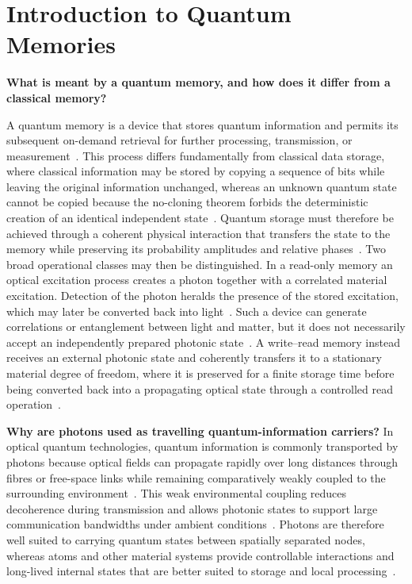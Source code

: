 \section{Introduction to Quantum Memories}
\label{sec:quantum_memories}

\noindent\textbf{What is meant by a quantum memory, and how does it differ from a classical memory?}

A quantum memory is a device that stores quantum information and permits its subsequent on-demand retrieval for further processing, transmission, or measurement~\cite{Qmeaara_HeshamiEtAl_2016,Oqm_LvovskyEtAl_2009}. This process differs fundamentally from classical data storage, where classical information may be stored by copying a sequence of bits while leaving the original information unchanged, whereas an unknown quantum state cannot be copied because the no-cloning theorem forbids the deterministic creation of an identical independent state~\cite{Oqm_LvovskyEtAl_2009}. Quantum storage must therefore be achieved through a coherent physical interaction that transfers the state to the memory while preserving its probability amplitudes and relative phases~\cite{AWAVQMitCoSR_Rodriguez_,Oqm_LvovskyEtAl_2009}. Two broad operational classes may then be distinguished. In a read-only memory an optical excitation process creates a photon together with a correlated material excitation. Detection of the photon heralds the presence of the stored excitation, which may later be converted back into light~\cite{AWAVQMitCoSR_Rodriguez_}. Such a device can generate correlations or entanglement between light and matter, but it does not necessarily accept an independently prepared photonic state~\cite{AWAVQMitCoSR_Rodriguez_}. A write--read memory instead receives an external photonic state and coherently transfers it to a stationary material degree of freedom, where it is preserved for a finite storage time before being converted back into a propagating optical state through a controlled read operation~\cite{Qmeaara_HeshamiEtAl_2016,AWAVQMitCoSR_Rodriguez_}.

\noindent\textbf{Why are photons used as travelling quantum-information carriers?}
In optical quantum technologies, quantum information is commonly transported by photons because optical fields can propagate rapidly over long distances through fibres or free-space links while remaining comparatively weakly coupled to the surrounding environment~\cite{Qmeaara_HeshamiEtAl_2016}. This weak environmental coupling reduces decoherence during transmission and allows photonic states to support large communication bandwidths under ambient conditions~\cite{Oqm_LvovskyEtAl_2009,Qmeaara_HeshamiEtAl_2016}. Photons are therefore well suited to carrying quantum states between spatially separated nodes, whereas atoms and other material systems provide controllable interactions and long-lived internal states that are better suited to storage and local processing~\cite{QmfpDp_FleischhauerEtAl_2002}. 

